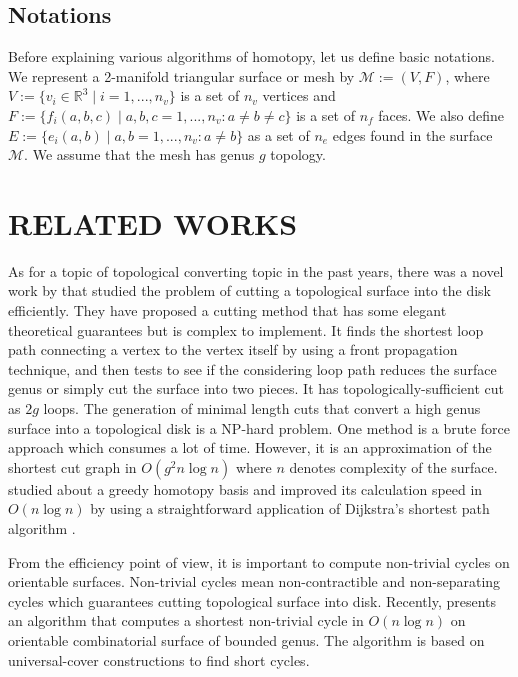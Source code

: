 \documentclass[a4paper,twoside]{article}
\begin{document}
\subsection{Notations}
Before explaining various algorithms of homotopy, let us define basic notations. We represent a 2-manifold triangular surface or mesh by $\mathscr{M}:=(V,F)$, where $V:=\{ v_{i}\in \mathbb{R}^3 \mid i = 1, ... , n_v\}$ is a set of $n_v$ vertices and $F:=\{ f_{i}(a,b,c) \mid a,b,c = 1, ... , n_v : a \neq b \neq c\}$ is a set of $n_f$ faces. We also define $E:=\{ e_{i}(a,b) \mid a,b = 1, ... , n_v : a \neq b\}$ as a set of $n_e$ edges found in the surface $\mathscr{M}$. We assume that the mesh has genus $g$ topology. 


\section{\uppercase{Related Works}}
\label{sec:related works}
\noindent As for a topic of topological converting topic in the past years, there was a novel work  by \cite{Erickson:2002:OCS:513400.513430} that studied the problem of cutting a topological surface into the disk efficiently. They have proposed a cutting method that has some elegant theoretical guarantees but is complex to implement. It finds the shortest loop path connecting a vertex to the vertex itself by using a front propagation technique, and then tests to see if the considering loop path reduces the surface genus or simply cut the surface into two pieces. It has topologically-sufficient cut as $2g$ loops. The generation of minimal length cuts that convert a high genus surface into a topological disk is a NP-hard problem. One method is a brute force approach which consumes a lot of time. However, it is an approximation of the shortest cut graph in $O(g^2 n \log n)$ where $n$ denotes complexity of the surface. \cite{Erickson:2005:GOH:1070432.1070581} studied about a greedy homotopy basis and improved its calculation speed in $O(n \log n)$
by using a straightforward application of Dijkstra's shortest path algorithm \cite{Dijkstra59anote}. 

From the efficiency point of view, it is important to compute non-trivial cycles on orientable surfaces. Non-trivial cycles mean non-contractible and non-separating cycles which guarantees cutting topological surface into disk. Recently, \cite{Kutz:2006:CSN:1137856.1137919} presents an algorithm that computes a shortest non-trivial cycle in $O(n \log n)$ on orientable combinatorial surface of bounded genus. The algorithm is based on universal-cover constructions to find short cycles.
\end{document}
